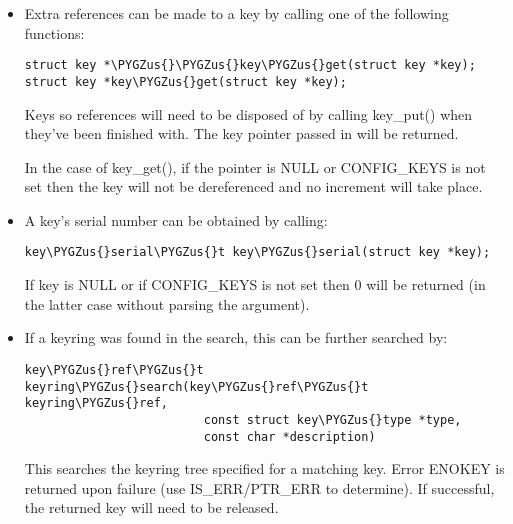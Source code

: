 \documentclass[a4paper,8pt,english]{sphinxmanual}
\def\PYGZus{\char`\_}
\begin{document}
\begin{itemize}
Or:

\begin{Verbatim}[commandchars=\\\{\}]
void key\PYGZus{}ref\PYGZus{}put(key\PYGZus{}ref\PYGZus{}t key\PYGZus{}ref);
\end{Verbatim}

These can be called from interrupt context. If CONFIG\_KEYS is not set then
the argument will not be parsed.

\item {} 
Extra references can be made to a key by calling one of the following
functions:

\begin{Verbatim}[commandchars=\\\{\}]
struct key *\PYGZus{}\PYGZus{}key\PYGZus{}get(struct key *key);
struct key *key\PYGZus{}get(struct key *key);
\end{Verbatim}

Keys so references will need to be disposed of by calling key\_put() when
they've been finished with.  The key pointer passed in will be returned.

In the case of key\_get(), if the pointer is NULL or CONFIG\_KEYS is not set
then the key will not be dereferenced and no increment will take place.

\item {} 
A key's serial number can be obtained by calling:

\begin{Verbatim}[commandchars=\\\{\}]
key\PYGZus{}serial\PYGZus{}t key\PYGZus{}serial(struct key *key);
\end{Verbatim}

If key is NULL or if CONFIG\_KEYS is not set then 0 will be returned (in the
latter case without parsing the argument).

\item {} 
If a keyring was found in the search, this can be further searched by:

\begin{Verbatim}[commandchars=\\\{\}]
key\PYGZus{}ref\PYGZus{}t keyring\PYGZus{}search(key\PYGZus{}ref\PYGZus{}t keyring\PYGZus{}ref,
                         const struct key\PYGZus{}type *type,
                         const char *description)
\end{Verbatim}

This searches the keyring tree specified for a matching key. Error ENOKEY
is returned upon failure (use IS\_ERR/PTR\_ERR to determine). If successful,
the returned key will need to be released.


\end{itemize}
\end{document}
